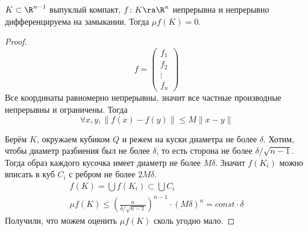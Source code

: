 \begin{lemma}
	$K \subset \R^{n-1}$ выпуклый компакт, $f\colon K \ra \R^n$ непрерывна и непрерывно дифференцируема на замыкании.
	Тогда $\mu f(K) = 0$.
\end{lemma}
\begin{proof}
	\[ f = \begin{pmatrix}f_1 \\ f_2 \\ \vdots \\ f_n\end{pmatrix} \]
	Все координаты равномерно непрерывны, значит все частные производные непрерывны и ограничены.
	Тогда
	\[ \forall x, y, \|f(x) - f(y)\| \le M \|x - y\| \]

	Берём $K$, окружаем кубиком $Q$ и режем на куски диаметра не более $\delta$.
	Хотим, чтобы диаметр разбиения был не более $\delta$, то есть сторона не более $\delta / \sqrt{n-1}$.
	Тогда образ каждого кусочка имеет диаметр не более $M\delta$.
	Значит $f(K_i)$ можно вписать в куб $C_i$ с ребром не более $2M\delta$.
	\begin{gather*}
		f(K) = \bigcup f(K_i) \subset \bigcup C_i \\
		\mu f(K) \le \left( \frac{a}{\delta / \sqrt{n-1}} \right)^{n-1} \cdot \left(M\delta\right)^n = const \cdot \delta
	\end{gather*}
	Получили, что можем оценить $\mu f(K)$ сколь угодно мало.
\end{proof}

